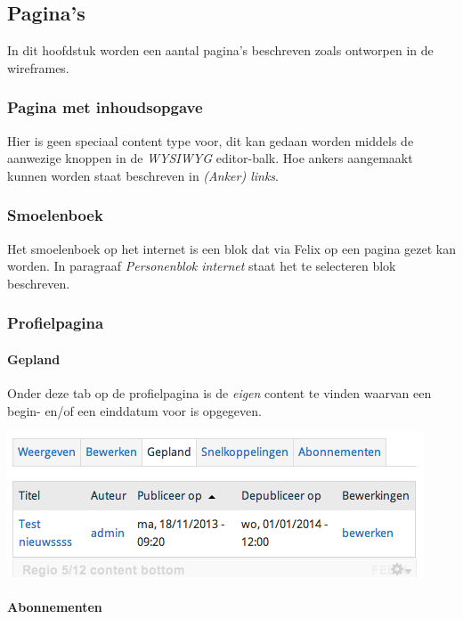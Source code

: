 \subsection{Pagina's}\label{paginas}
In dit hoofdstuk worden een aantal pagina's beschreven zoals ontworpen in de wireframes.

\subsubsection{Pagina met inhoudsopgave}\label{paginainhoudsopgave}
Hier is geen speciaal content type voor, dit kan gedaan worden middels de aanwezige knoppen in de \emph{WYSIWYG} editor-balk. Hoe ankers aangemaakt kunnen worden staat beschreven in \emph{(Anker) links}.

\subsubsection{Smoelenboek}\label{smoelenboek}
Het smoelenboek op het internet is een blok dat via Felix op een pagina gezet kan worden. In paragraaf \emph{Personenblok internet} staat het te selecteren blok beschreven.

\subsubsection{Profielpagina}\label{profielpagina}

\paragraph{Gepland}

Onder deze tab op de profielpagina is de \emph{eigen} content te vinden waarvan een begin- en/of een einddatum voor is opgegeven.

\begin{center}
	\includegraphics[scale=0.75]{img/schedulerprofile.png}
\end{center}

\paragraph{Abonnementen}\label{profileabonnementen}


